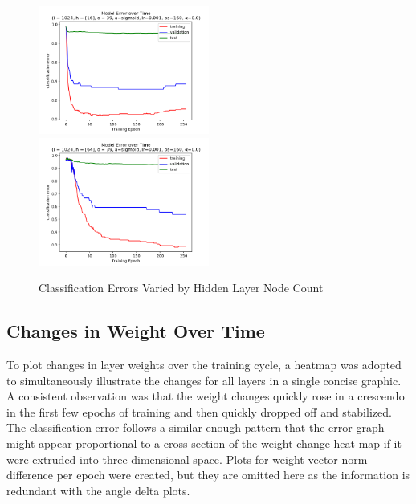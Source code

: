 \documentclass[10pt,epsf]{article}
\begin{document}
{{\begin{figure}[h]
      \includegraphics[width=0.5\textwidth]{./img/16-0.001-160-0-sigmoid-1/error-255.png}
      \includegraphics[width=0.5\textwidth]{./img/64-0.001-160-0-sigmoid-1/error-255.png}
      \caption{Classification Errors Varied by Hidden Layer Node Count}
      \label{fig:error-by-nh}
    \end{figure}
  }
  \subsection{Changes in Weight Over Time}{
    To plot changes in layer weights over the training cycle, a heatmap was adopted to simultaneously
    illustrate the changes for all layers in a single concise graphic. A consistent observation was
    that the weight changes quickly rose in a crescendo in the first few epochs of training and then
    quickly dropped off and stabilized. The classification error follows a similar enough pattern that
    the error graph might appear proportional to a cross-section of the weight change heat map
    if it were extruded into three-dimensional space. Plots for weight vector norm difference per epoch
    were created, but they are omitted here as the information is redundant with the angle delta plots.
}}
\end{document}
